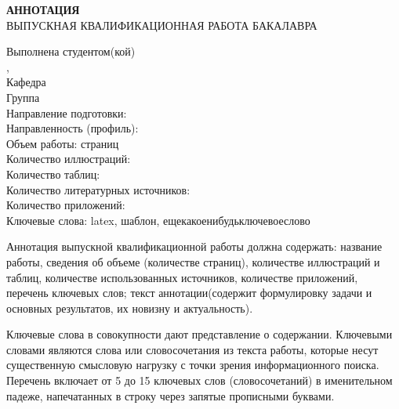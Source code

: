 \newpage
\thispagestyle{empty}

\begin{par}
\setlength{\baselineskip}{5mm}

\begin{center}
	\textbf{АННОТАЦИЯ} \\
	\vspace{5mm}
	ВЫПУСКНАЯ КВАЛИФИКАЦИОННАЯ РАБОТА БАКАЛАВРА \\
        \noindent
\end{center}

\begin{flushleft}
	Выполнена студентом(кой) \uline{\studentforabstract\hfill} \\
	\faculty, \university \\
	Кафедра \uline{\department\hfill} \\
	Группа \uline{\group} \\
	Направление подготовки: \programnum\thinspace\programname \\
	Направленность (профиль): \specialization \\
    \vspace{5mm}
	Объем работы:  страниц \\
	Количество иллюстраций: \totalfigures \\
	Количество таблиц: \totaltables \\
	Количество литературных источников:  \\
	Количество приложений:  \\
	Ключевые слова: latex, шаблон, ещекакоенибудьключевоеслово
\end{flushleft}

Аннотация выпускной квалификационной работы должна содержать: название работы, сведения об объеме (количестве страниц), количестве иллюстраций и таблиц, количестве использованных источников, количестве приложений, перечень ключевых слов; текст аннотации(содержит формулировку задачи и основных результатов, их новизну и актуальность). 

Ключевые слова в совокупности дают представление о содержании. Ключевыми словами являются слова или словосочетания из текста работы, которые несут существенную смысловую нагрузку с точки зрения информационного поиска. Перечень включает от 5 до 15 ключевых слов (словосочетаний) в именительном падеже, напечатанных в строку через запятые прописными буквами. 


\end{par}
